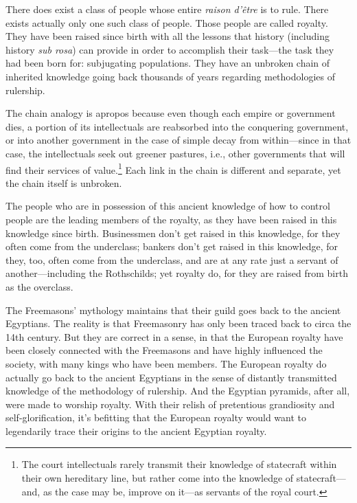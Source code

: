 \documentclass[letterpaper,12pt]{article}
\begin{document}
There does exist a class of people whose entire \emph{raison d'\^{e}tre} is to rule. There exists actually only one such class of people. Those people are called royalty. They have been raised since birth with all the lessons that history (including history \emph{sub rosa}) can provide in order to accomplish their task---the task they had been born for: subjugating populations. They have an unbroken chain of inherited knowledge going back thousands of years regarding methodologies of rulership.

The chain analogy is apropos because even though each empire or government dies, a portion of its intellectuals are reabsorbed into the conquering government, or into another government in the case of simple decay from within---since in that case, the intellectuals seek out greener pastures, i.e., other governments that will find their services of value.\footnote{The court intellectuals rarely transmit their knowledge of statecraft within their own hereditary line, but rather come into the knowledge of statecraft---and, as the case may be, improve on it---as servants of the royal court.} Each link in the chain is different and separate, yet the chain itself is unbroken.

The people who are in possession of this ancient knowledge of how to control people are the leading members of the royalty, as they have been raised in this knowledge since birth. Businessmen don't get raised in this knowledge, for they often come from the underclass; bankers don't get raised in this knowledge, for they, too, often come from the underclass, and are at any rate just a servant of another---including the Rothschilds; yet royalty do, for they are raised from birth as the overclass.

The Freemasons' mythology maintains that their guild goes back to the ancient Egyptians. The reality is that Freemasonry has only been traced back to circa the 14th century. But they are correct in a sense, in that the European royalty have been closely connected with the Freemasons and have highly influenced the society, with many kings who have been members. The European royalty do actually go back to the ancient Egyptians in the sense of distantly transmitted knowledge of the methodology of rulership. And the Egyptian pyramids, after all, were made to worship royalty. With their relish of pretentious grandiosity and self-glorification, it's befitting that the European royalty would want to legendarily trace their origins to the ancient Egyptian royalty.
\end{document}
